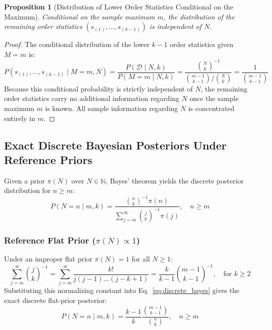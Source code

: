 \documentclass[10pt,a4paper]{article}
\newtheorem{proposition}{Proposition}
\begin{document}
\begin{proposition}[Distribution of Lower Order Statistics Conditional on the Maximum]
Conditional on the sample maximum $m$, the distribution of the remaining order statistics $(s_{(1)}, \dots, s_{(k-1)})$ is independent of $N$.
\end{proposition}
\begin{proof}
The conditional distribution of the lower $k-1$ order statistics given $M = m$ is:
\begin{equation}
P(s_{(1)}, \dots, s_{(k-1)} \mid M = m, N) = \frac{P(\mathcal{D} \mid N, k)}{P(M = m \mid N, k)} = \frac{\binom{N}{k}^{-1}}{\binom{m-1}{k-1} / \binom{N}{k}} = \frac{1}{\binom{m-1}{k-1}}
\end{equation}
Because this conditional probability is strictly independent of $N$, the remaining order statistics carry no additional information regarding $N$ once the sample maximum $m$ is known. All sample information regarding $N$ is concentrated entirely in $m$.
\end{proof}

\subsection{Exact Discrete Bayesian Posteriors Under Reference Priors}
Given a prior $\pi(N)$ over $N \in \mathbb{N}$, Bayes' theorem yields the discrete posterior distribution for $n \ge m$:
\begin{equation}
P(N = n \mid m, k) = \frac{\binom{n}{k}^{-1} \pi(n)}{\sum_{j=m}^\infty \binom{j}{k}^{-1} \pi(j)}, \quad n \ge m
\label{eq:discrete_bayes}
\end{equation}

\subsubsection{Reference Flat Prior (\texorpdfstring{$\pi(N) \propto 1$}{pi(N) propto 1})}
Under an improper flat prior $\pi(N) = 1$ for all $N \ge 1$:
\begin{equation}
\sum_{j=m}^\infty \binom{j}{k}^{-1} = \sum_{j=m}^\infty \frac{k!}{j(j-1)\dots(j-k+1)} = \frac{k}{k-1} \binom{m-1}{k-1}^{-1}, \quad \text{for } k \ge 2
\end{equation}
Substituting this normalizing constant into Eq.~\eqref{eq:discrete_bayes} gives the exact discrete flat-prior posterior:
\begin{equation}
P(N = n \mid m, k) = \frac{k - 1}{k} \frac{\binom{m-1}{k-1}}{\binom{n}{k}}, \quad n \ge m
\label{eq:flat_posterior}
\end{equation}
\end{document}
